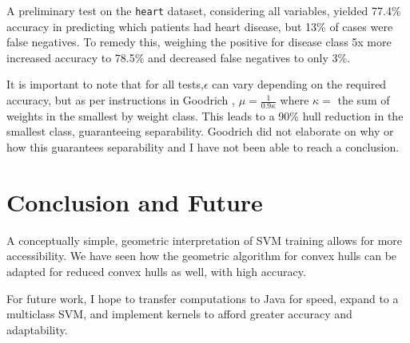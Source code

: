 \documentclass[11pt]{article}
\theoremstyle{remark}	  \newtheorem*{remark}{Remark}
\numberwithin{equation}{section}
\begin{document}
A preliminary test on the \texttt{heart} dataset, considering all variables, yielded 77.4\% accuracy in predicting which patients had heart disease, but 13\% of cases were false negatives. To remedy this, weighing the positive for disease class 5x more increased accuracy to 78.5\% and decreased false negatives to only 3\%.

It is important to note that for all tests,$\epsilon$ can vary depending on the required accuracy, but as per instructions in Goodrich \cite{goodrich_training_2011}, $\mu=\frac{1}{0.9\kappa}$ where $\kappa =$ the sum of weights in the smallest by weight class. This leads to a 90\% hull reduction in the smallest class, guaranteeing separability. Goodrich did not elaborate on why or how this guarantees separability and I have not been able to reach a conclusion.

\section{Conclusion and Future}

A conceptually simple, geometric interpretation of SVM training allows for more accessibility. We have seen how the geometric algorithm for convex hulls can be adapted for reduced convex hulls as well, with high accuracy.

For future work, I hope to transfer computations to Java for speed, expand to a multiclass SVM, and implement kernels to afford greater accuracy and adaptability.



\end{document}
